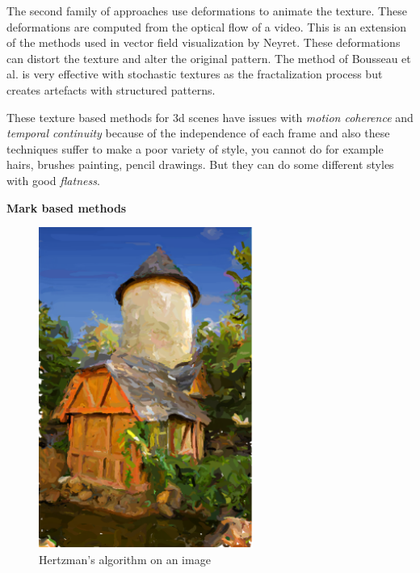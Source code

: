 The second family of approaches use deformations to animate the texture\cite{bousseau_video_2007}. These deformations are computed from the optical flow of a video. This is an extension of the methods used in vector field visualization by Neyret\cite{neyret_imagis-gravir_nodate}. These deformations can distort the texture and alter the original pattern. The method of Bousseau et al.\cite{bousseau_video_2007} is very effective with stochastic textures as the fractalization process but creates artefacts with structured patterns. \newline

These texture based methods for 3d scenes have issues with \textit{motion coherence} and \textit{temporal continuity} because of the independence of each frame and also these techniques suffer to make a poor variety of style, you cannot do for example hairs, brushes painting, pencil drawings. But they can do some different styles with good \textit{flatness}.\newline

\textbf{Mark based methods}

\begin{figure}[H]
    \begin{center}

    \includegraphics[scale=0.5]{pics/hertzmann_algo.png}
    \end{center}
    \caption{Hertzman's algorithm on an image \cite{rosin_stroke_2013}}
    \label{Hertzman_algo}
\end{figure}

